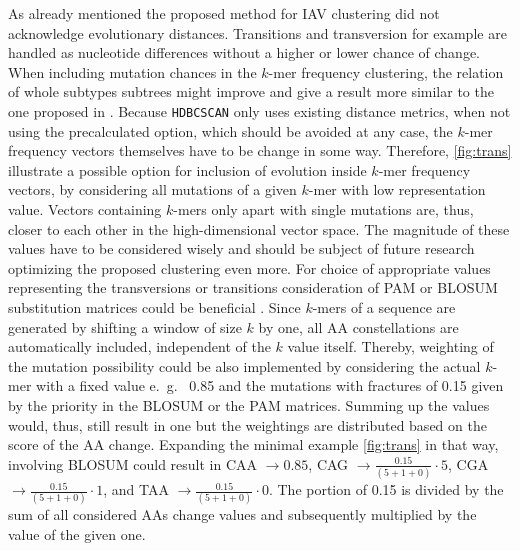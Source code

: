 \vspace{1em}

As already mentioned the proposed method for \gls{IAV} clustering did not acknowledge evolutionary distances. Transitions and transversion for example are handled as nucleotide differences without a higher or lower chance of change. When including mutation chances in the $k$-mer frequency clustering, the relation of whole subtypes subtrees might improve and give a result more similar to the one proposed in \textcite{wei_next-generation_2020}. Because \texttt{HDBCSCAN} only uses existing distance metrics, when not using the precalculated option, which should be avoided at any case, the $k$-mer frequency vectors themselves have to be change in some way. Therefore, \autoref{fig:trans} illustrate a possible option for inclusion of evolution inside $k$-mer frequency vectors, by considering all mutations of a given $k$-mer with low representation value. Vectors containing $k$-mers only apart with single mutations are, thus, closer to each other in the high-dimensional vector space. The magnitude of these values have to be considered wisely and should be subject of future research optimizing the proposed clustering even more. For choice of appropriate values representing the transversions or transitions consideration of PAM or BLOSUM substitution matrices could be beneficial \autocite{mount_comparison_2008}. Since $k$-mers of a sequence are generated by shifting a window of size $k$ by one, all \gls{AA} constellations are automatically included, independent of the $k$ value itself. Thereby, weighting of the mutation possibility could be also implemented by considering the actual $k$-mer with a fixed value e.~g.~ 0.85 and the mutations with fractures of 0.15 given by the priority in the BLOSUM or the PAM matrices. Summing up the values would, thus, still result in one but the weightings are distributed based on the score of the \gls{AA} change. Expanding the minimal example \autoref{fig:trans} in that way, involving BLOSUM could result in CAA $\rightarrow 0.85$, CAG $\rightarrow \frac{0.15}{(5+1+0)}\cdot 5$, CGA $\rightarrow \frac{0.15}{(5+1+0)}\cdot 1$, and TAA $\rightarrow \frac{0.15}{(5+1+0)}\cdot 0$. The portion of 0.15 is divided by the sum of all considered \glspl{AA} change values and subsequently multiplied by the value of the given one.